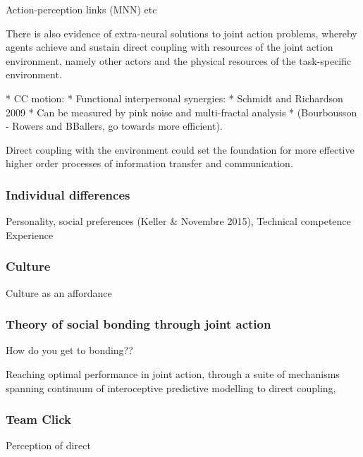 \begin{CJK}{UTF8}{gbsn}
{            Action-perception links (MNN) etc




There is also evidence of extra-neural solutions to joint action problems, whereby agents achieve and sustain direct coupling with resources of the joint action environment, namely other actors and the physical resources of the task-specific environment.

      * CC motion:
      * Functional interpersonal synergies:
      * Schmidt and Richardson 2009
          * Can be measured by pink noise and multi-fractal analysis
      * (Bourbousson - Rowers and BBallers, go towards more efficient).

Direct coupling with the environment could set the foundation for more effective higher order processes of information transfer and communication.


\subsubsection{Individual differences}

Personality, social preferences (Keller & Novembre 2015),
Technical competence
Experience

\subsubsection{Culture}


    Culture as an affordance


\subsubsection{Theory of social bonding through joint action}


How do you get to bonding?? 


Reaching optimal performance in joint action, through a suite of mechanisms spanning continuum of interoceptive predictive modelling to direct coupling,

\subsubsection{Team Click}
Perception of direct













































}
\end{CJK}
